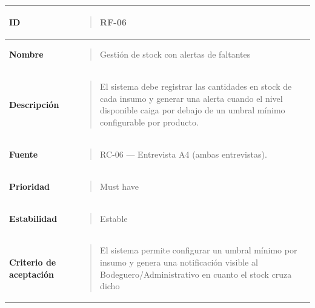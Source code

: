\documentclass[
]{article}
\newcounter{none} %
\begin{document}
{\def\LTcaptype{none} %
\begin{longtable}[]{@{}
  >{\raggedright\arraybackslash}p{}
  >{\raggedright\arraybackslash}p{}@{}}
\toprule\noalign{}
\begin{minipage}[b]{\linewidth}\raggedright
\textbf{ID}
\end{minipage} & \begin{minipage}[b]{\linewidth}\raggedright
\begin{quote}
RF-06
\end{quote}
\end{minipage} \\
\midrule\noalign{}
\endhead
\bottomrule\noalign{}
\endlastfoot
\textbf{Nombre} & \begin{minipage}[t]{\linewidth}\raggedright
\begin{quote}
Gestión de stock con alertas de faltantes
\end{quote}
\end{minipage} \\
\textbf{Descripción} & \begin{minipage}[t]{\linewidth}\raggedright
\begin{quote}
El sistema debe registrar las cantidades en stock de cada insumo y
generar una alerta cuando el nivel disponible caiga por debajo de un
umbral mínimo configurable por producto.
\end{quote}
\end{minipage} \\
\textbf{Fuente} & \begin{minipage}[t]{\linewidth}\raggedright
\begin{quote}
RC-06 --- Entrevista A4 (ambas entrevistas).
\end{quote}
\end{minipage} \\
\textbf{Prioridad} & \begin{minipage}[t]{\linewidth}\raggedright
\begin{quote}
Must have
\end{quote}
\end{minipage} \\
\textbf{Estabilidad} & \begin{minipage}[t]{\linewidth}\raggedright
\begin{quote}
Estable
\end{quote}
\end{minipage} \\
\textbf{Criterio de aceptación} &
\begin{minipage}[t]{\linewidth}\raggedright
\begin{quote}
El sistema permite configurar un umbral mínimo por insumo y genera una
notificación visible al Bodeguero/Administrativo en cuanto el stock
cruza dicho


\end{quote}
\end{minipage}
\end{longtable}}
\end{document}
